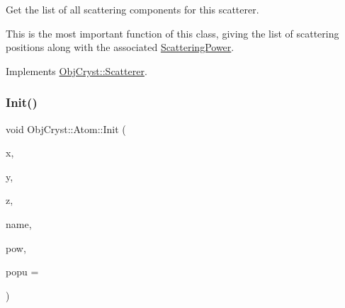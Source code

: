 Get the list of all scattering components for this scatterer. 

This is the most important function of this class, giving the list of scattering positions along with the associated \mbox{\hyperlink{class_obj_cryst_1_1_scattering_power}{Scattering\+Power}}. 

Implements \mbox{\hyperlink{class_obj_cryst_1_1_scatterer_aca0e08e3793cc69d31fce53e481c2a67}{Obj\+Cryst\+::\+Scatterer}}.

\mbox{\label{class_obj_cryst_1_1_atom_ab05ef76113333041255789dba4bb60cd}} 
\subsubsection{\texorpdfstring{Init()}{Init()}}
{\footnotesize\ttfamily void Obj\+Cryst\+::\+Atom\+::\+Init (\begin{DoxyParamCaption}\item[{const R\+E\+AL}]{x,  }\item[{const R\+E\+AL}]{y,  }\item[{const R\+E\+AL}]{z,  }\item[{const string \&}]{name,  }\item[{const \mbox{\hyperlink{class_obj_cryst_1_1_scattering_power}{Scattering\+Power}} $\ast$}]{pow,  }\item[{const R\+E\+AL}]{popu = {} }\end{DoxyParamCaption})}

